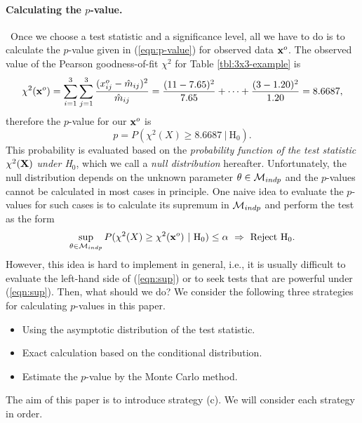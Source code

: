 \documentclass[12pt]{article}
\theoremstyle{definition}
\def\Bx{{\bf x}}
\def\BX{{\bf X}}
\def\Btheta{{\bf \theta}}
\begin{document}
\paragraph*{Calculating the $p$-value.}\ Once we choose a test
statistic and a significance level, all we have to do is to calculate the
$p$-value given in (\ref{eqn:p-value}) for observed data $\Bx^o$. 
The observed value of the Pearson goodness-of-fit $\chi^2$ 
for Table \ref{tbl:3x3-example} is
\[
\chi^2(\Bx^o) = \sum_{i=1}^3\sum_{j=1}^3\frac{(x_{ij}^o -
\hat{m}_{ij})^2}{\hat{m}_{ij}} = \frac{(11-7.65)^2}{7.65} + \cdots +
\frac{(3-1.20)^2}{1.20} = 8.6687,
\]
therefore the $p$-value for our $\Bx^o$ is
\[
 p = P(\chi^2(X) \geq 8.6687\ |\ \mbox{H}_0).
\]
This probability is evaluated based on the {\it probability function of
the test statistic $\chi^2(\BX)$ under H$_0$}, which we call a {\it
null distribution} hereafter. 
Unfortunately, the null distribution 
depends on the unknown parameter $\Btheta \in {\cal M}_{indp}$ and
the $p$-values cannot be calculated in most cases in principle. 
One naive idea to evaluate the $p$-values for such cases 
is to calculate its supremum in
${\cal M}_{indp}$ and perform the test as the form
\begin{equation}
 \sup_{\Btheta \in {\cal M}_{indp}} P(\chi^2(X) \geq \chi^2(\Bx^o)\ |\
 \mbox{H}_0) \leq \alpha\ \Rightarrow\ \mbox{Reject}\ \mbox{H}_0.
\label{eqn:sup}
\end{equation}
However, this idea is hard to implement in general, i.e., 
it is usually difficult to 
evaluate the left-hand side of
(\ref{eqn:sup}) or to seek tests that are powerful under (\ref{eqn:sup}). 
Then, what should we do? We consider the following three strategies for
calculating $p$-values in this paper. 
\begin{itemize}
\item[(a)] Using the asymptotic distribution of the test statistic.
\item[(b)] Exact calculation based on the conditional distribution.
\item[(c)] Estimate the $p$-value by the Monte Carlo method.
\end{itemize}
The aim of this paper is to introduce strategy (c). We will consider
each strategy in order.
\end{document}
